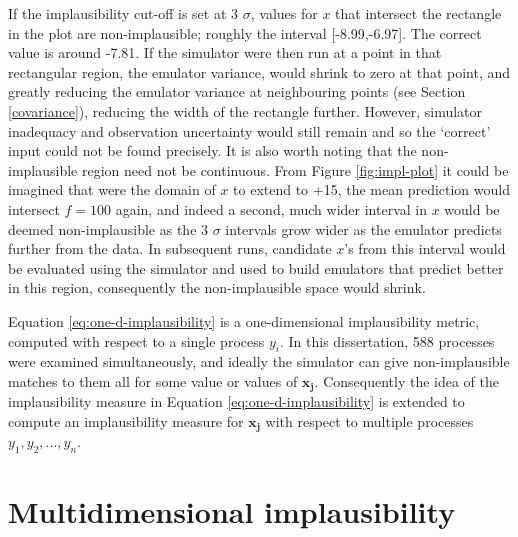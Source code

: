 \documentclass[
  12pt,
  a4paper,
  twoside]{book}
\begin{document}
If the implausibility cut-off is set at 3 \(\sigma\), values for \(x\) that intersect the rectangle in the plot are non-implausible; roughly the interval {[}-8.99,-6.97{]}. The correct value is around -7.81. If the simulator were then run at a point in that rectangular region, the emulator variance, would shrink to zero at that point, and greatly reducing the emulator variance at neighbouring points (see Section \ref{covariance}), reducing the width of the rectangle further. However, simulator inadequacy and observation uncertainty would still remain and so the `correct' input could not be found precisely. It is also worth noting that the non-implausible region need not be continuous. From Figure \ref{fig:impl-plot} it could be imagined that were the domain of \(x\) to extend to +15, the mean prediction would intersect \(f=100\) again, and indeed a second, much wider interval in \(x\) would be deemed non-implausible as the 3 \(\sigma\) intervals grow wider as the emulator predicts further from the data. In subsequent runs, candidate \(x\)'s from this interval would be evaluated using the simulator and used to build emulators that predict better in this region, consequently the non-implausible space would shrink.

Equation \eqref{eq:one-d-implausibility} is a one-dimensional implausibility metric, computed with respect to a single process \(y_i\). In this dissertation, 588 processes were examined simultaneously, and ideally the simulator can give non-implausible matches to them all for some value or values of \(\mathbf{x_j}\). Consequently the idea of the implausibility measure in Equation \eqref{eq:one-d-implausibility} is extended to compute an implausibility measure for \(\mathbf{x_j}\) with respect to multiple processes \(y_1,y_2,...,y_n\).

\hypertarget{HM-Multi-D}{%
\section{Multidimensional implausibility}\label{HM-Multi-D}}
\end{document}
